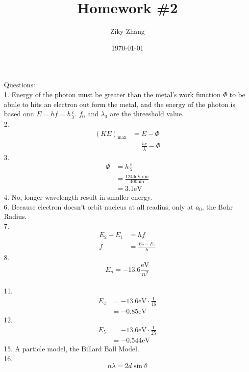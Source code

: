 \documentclass[11pt]{article}
\author{Ziky Zhang}
\date{\today}
\title{Homework \#2}
\begin{document}
\maketitle
\begin{minipage}[t]{.48\textwidth}
Questions: \\
1. Energy of the photon must be greater than the metal's work function \( \Phi \) to be abnle to hits an electron out form the metal, and the energy of the photon is based onn \( E = hf = h \frac{c}{\lambda} \). \( f_0 \) and \( \lambda_{0} \) are the threeshold value. \\
2. \begin{align*}
(KE)_\mathrm{max} &= E - \Phi \\
    &= \frac{hc}{\lambda} - \Phi
\end{align*}
3. \begin{align*}
\Phi &= h \frac{c}{\lambda} \\
  &= \frac{1240 \mathrm{eV \ nm}}{400 \mathrm{nm}} \\
  &= 3.1 \mathrm{eV}
\end{align*}
4. No, longer wavelength result in smaller energy. \\
6. Because electron doesn't orbit nucleus at all readius, only at \( a_{0} \), the Bohr Radius. \\
7. \begin{align*}
E_2 - E_1 &= hf \\
f &= \frac{E_2 - E_1}{h}
\end{align*}
8. \[ E_n = -13.6 \frac{\mathrm{eV}}{n^2} \] \\
11.
\begin{align*}
E_4 &= -13.6 \mathrm{eV} \cdot \frac{1}{16} \\
  &= -0.85 \mathrm{eV}
\end{align*}
12.
\begin{align*}
E_5 &= -13.6 \mathrm{eV} \cdot \frac{1}{25} \\
  &= -0.544 \mathrm{eV}
\end{align*}
15. A particle model, the Billard Ball Model. \\
16. \[ n\lambda = 2d \sin{\theta} \]
\end{minipage}
\begin{minipage}[t]{.48\textwidth}

\end{minipage}
\end{document}
